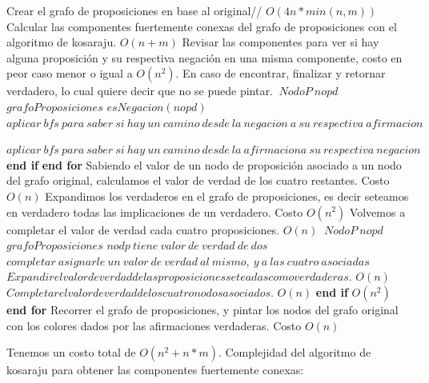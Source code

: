\begin{codebox}
	\li  Crear el grafo de proposiciones en base al original// $O(4n*min(n,m))$
	\li Calcular las componentes fuertemente conexas del grafo de proposiciones con el algoritmo de kosaraju. \li {} $ O( n +m ) $
	\li Revisar las componentes para ver si hay alguna proposición y su respectiva negación en una misma 
	\li componente, costo en peor caso menor o igual a $ O(n^{2}) $.
	\li En caso de encontrar, finalizar y retornar verdadero, lo cual quiere decir que no se puede pintar.
	\li \For $\  NodoP \ nopd $ \To $ grafoProposiciones$ \Do	
	\li			\If $ esNegacion(nopd)$
	\li	\Then $aplicar \ bfs\ para\ saber\ si\ hay\ un\ camino\ desde\ la\ negacion\ a\ su\ respectiva\ afirmacion$
	\li {}						

				\End
	\li		\Then		\Else $ aplicar\ bfs\ para\ saber\ si\ hay\ un\ camino\ desde\ la\ afirmacion a\ su\ respectiva\ negacion$
\li {}						
			\End
\li	\textbf{end if}\End
\End
	\li \textbf{end for}	
	\li Sabiendo el valor de un nodo de proposición asociado a un nodo del grafo original, calculamos el valor \li de verdad de los cuatro restantes. Costo $ O(n) $
	\li Expandimos los verdaderos en el grafo de proposiciones, es decir seteamos en verdadero todas las \li implicaciones de un verdadero. Costo $ O(n^2) $
	\li Volvemos a completar el valor de verdad cada cuatro proposiciones. $ O(n) $
	\li \For $\  NodoP \ nopd $ \To $ grafoProposiciones$ \Do	
	\li	\Then		\If $ nodp\ tiene\ valor\ de\ verdad\ de\ dos$
	\li	\Then $completar\ asignarle\ un\ valor\ de\ verdad\ al\ mismo,\ y\ a\ las\ cuatro\ asociadas$
	\li $Expandir el valor de verdad de las proposiciones seteadas como verdaderas.$ $ O(n) $
	\li $Completar el valor de verdad de los cuatro nodos asociados.$ $ O(n) $
		\End
	\li \textbf{end if}	$ O(n^2) $	\End
	\li \textbf{end for}
	\li Recorrer el grafo de proposiciones, y pintar los nodos del grafo original con los colores dados por \li las afirmaciones verdaderas. Costo $ O(n) $
				      
\end{codebox}

Tenemos un costo total de $ O(n^2 + n*m) $. Complejidad del algoritmo de kosaraju para obtener las componentes fuertemente conexas:

